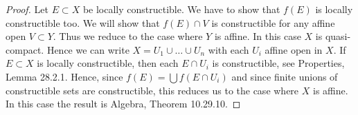 \begin{proof}
Let $E\subset X$ be locally constructible. We have to show that $f(E)$ is locally constructible too. We will show that $f(E)\cap V$ is constructible for any affine open $V\subset Y$. Thus we reduce to the case where $Y$ is affine. In this case $X$ is quasi-compact. Hence we can write $X=U_1\cup\ldots\cup U_n$ with each $U_i$ affine open in $X$. If $E\subset X$ is locally constructible, then each $E\cap U_i$ is constructible, see Properties, Lemma 28.2.1. Hence, since $f(E)=\bigcup f(E\cap U_i)$ and since finite unions of constructible sets are constructible, this reduces us to the case where $X$ is affine. In this case the result is Algebra, Theorem 10.29.10.
\end{proof}

